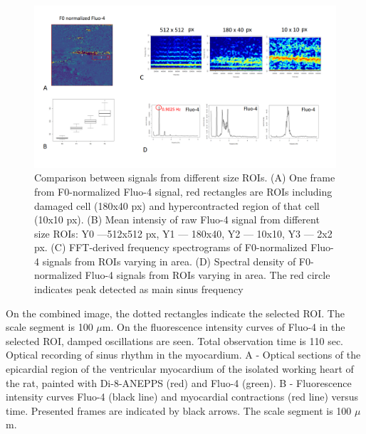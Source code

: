 \documentclass{biophys-new}
\begin{document}
\begin{figure}
    \includegraphics[width=0.9\linewidth]{fig3.png}
    \caption{Comparison between signals from different size ROIs. (A) One frame from F0-normalized Fluo-4 signal, red rectangles are  ROIs including damaged cell (180x40 px) and hypercontracted region of that cell (10x10 px). (B) Mean intensiy of raw Fluo-4 signal from different size ROIs: Y0 ---512x512 px, Y1 --- 180x40, Y2 --- 10x10, Y3 --- 2x2 px. (C) FFT-derived frequency spectrograms of F0-normalized Fluo-4 signals from ROIs varying in area. (D) Spectral density of F0-normalized Fluo-4 signals from ROIs varying in area. The red circle indicates peak detected as main sinus frequency }
    \label{fig:fig3}
\end{figure}


On the combined image, the dotted rectangles indicate the selected ROI.
The scale segment is 100 $\mu$m.
On the fluorescence intensity curves of Fluo-4 in the selected ROI, damped oscillations are seen.
Total observation time is 110 sec.
Optical recording of sinus rhythm in the myocardium.
A - Optical sections of the epicardial region of the ventricular myocardium of the isolated working heart of the rat, painted with Di-8-ANEPPS (red) and Fluo-4 (green). B - Fluorescence intensity curves Fluo-4 (black line) and myocardial contractions (red line) versus time. Presented frames are indicated by black arrows.
The scale segment is 100 $\mu$m.
\end{document}
